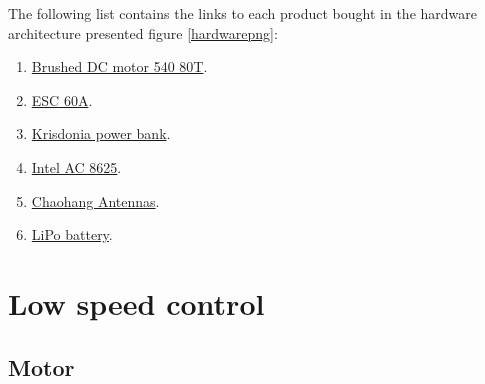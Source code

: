 		The following list contains the links to each product bought in the 
		hardware architecture presented figure \vref{hardwarepng}:
		\begin{enumerate}
			\item [\textbullet] \href{https://www.amazon.ca/Brushed-Motor-Poles-Alloy-Sensorless/dp/B07DG1M6GG/ref=sr\_1\_2\_sspa?keywords=rc+motor+540\&qid=1560194350\&s=gateway\&sr=8-2-spons\&psc=1\&smid=A25D668S2Q0USJ}{Brushed DC motor 540 80T}.
			\item [\textbullet] \href{https://www.amazon.ca/dp/B01LQ5815I/ref=sspa\_dk\_detail\_9?psc=1\&pd\_rd\_i=B01LQ5815I\&pd\_rd\_w=KE07s\&pf\_rd\_p=4b7c8c1c-293f-4b1e-a49a-8787dff31bcb\&pd\_rd\_wg=tw4bW\&pf\_rd\_r=FCD2V9TCG2GP9CZTJ48H\&pd\_rd\_r=c195eecb-8c58-11e9-b4d5-432c6a0843e7}{ESC 60A}.
			\item[\textbullet] \href{https://www.amazon.com/dp/B076GYGR6M}{Krisdonia power bank}.
			\item[\textbullet] \href{https://www.amazon.com/gp/product/B0721MLM8B/ref=ppx\_yo\_dt\_b\_asin\_title\_o00\_s00?ie=UTF8\&psc=1}{Intel AC 8625}.
			\item[\textbullet] \href{https://www.amazon.com/gp/product/B01E29566W/ref=ppx\_yo\_dt\_b\_asin\_title\_o00\_s00?ie=UTF8\&psc=1}{Chaohang Antennas}.
			\item[\textbullet] \href{https://www.amazon.ca/Fconegy-7000mAh-40CLipo-Rechargeable-hardcase/dp/B07HHSKFND/ref=sr\_1\_2\_sspa?keywords=lipo\%2Bbattery\%2B3s\%2Btruck\%2Brc\%2Bcar\&qid=1560269139\&s=gateway\&sr=8-2-spons\&th=1}{LiPo battery}.
		\end{enumerate}
		
	\section{Low speed control}\label{motor}
	
		\subsection{Motor}
		
